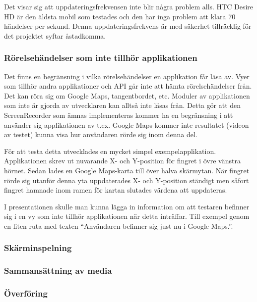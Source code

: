 Det visar sig att uppdateringsfrekvensen inte blir några problem alls. HTC Desire HD är den äldsta mobil som testades och den har inga problem att klara 70 händelser per sekund. Denna uppdateringsfrekvens är med säkerhet tillräcklig för det projektet syftar åstadkomma.

\subsubsection{Rörelsehändelser som inte tillhör applikationen}
\label{toucheventsoutofapi}
Det finns en begränsning i vilka rörelsehändelser en applikation får läsa av. Vyer som tillhör andra applikationer och API går inte att hämta rörelsehändelser från. Det kan röra sig om Google Maps, tangentbordet, etc. Moduler av applikationen som inte är gjorda av utvecklaren kan alltså inte läsas från. Detta gör att den ScreenRecorder som ämnas implementeras kommer ha en begränsning i att använder sig applikationen av t.ex. Google Maps kommer inte resultatet (videon av testet) kunna visa hur användaren rörde sig inom denna del.

För att testa detta utvecklades en mycket simpel exempelapplikation. Applikationen skrev ut nuvarande X- och Y-position för fingret i övre vänstra hörnet. Sedan lades en Google Maps-karta till över halva skärmytan. När fingret rörde sig utanför denna yta uppdaterades X- och Y-position ständigt men såfort fingret hamnade inom ramen för kartan slutades värdena att uppdateras.

I presentationen skulle man kunna lägga in information om att testaren befinner sig i en vy som inte tillhör applikationen när detta inträffar. Till exempel genom en liten ruta med texten ``Användaren befinner sig just nu i Google Maps.''.

\subsubsection{Skärminspelning}

\subsubsection{Sammansättning av media}

\subsubsection{Överföring}